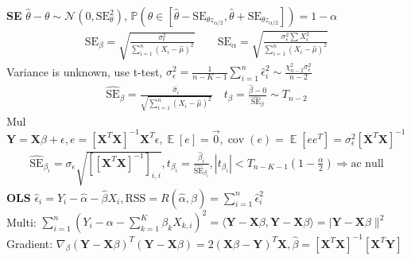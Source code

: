 \documentclass[10pt,landscape, a4paper]{article}
\theoremstyle{remark}
\newcommand{\E}{\operatorname{\mathbb{E}}}
\newcommand{\abs}[1]{\left\lvert #1 \right\rvert}
\newcommand{\cov}[1]{\operatorname{cov}(#1)}
\newcommand{\SE}{\mathrm{SE}}
\newcommand{\prob}{\mathbb{P}}
\begin{document}
\begin{multicols*}{3}
\textbf{SE} $\hat{\theta} - \theta \sim \mathcal{N} (0, \SE^2_{\theta})$, $\prob (\theta \in [\hat{\theta} - \SE_{\theta z_{\alpha /2}}, \hat{\theta} + \SE_{\theta z_{\alpha /2}}]) = 1-\alpha$
\begin{align*}
    \SE_\beta = \sqrt{\frac{\sigma^2_\epsilon}{\sum^n_{i=1} (X_i -\hat{\mu})^2}} \qquad 
    \SE_\alpha = \sqrt{\frac{\sigma^2_{\epsilon} \sum X_i^2}{\sum^n_{i=1} (X_i - \hat{\mu})^2}}
\end{align*}
Variance is unknown, use t-test, $\sigma^2_\epsilon = \frac{1}{n-K-1}\sum^n_{i=1} \hat{\epsilon}^2_i\sim \frac{\chi^2_{n-2} \sigma^2_{\epsilon}}{n-2} $
\begin{align*}
    \hat{\SE}_\beta = \frac{\hat{\sigma}_\epsilon}{\sqrt{\sum^n_{i=1} (X_i - \hat{\mu})^2}} \quad t_\beta = \frac{\hat{\beta} - 0}{\hat{\SE}_\beta} \sim T_{n-2}
\end{align*}
Mul $\mathbf{Y} = \mathbf{X}\beta + \epsilon, e = [\mathbf{X}^T \mathbf{X}]^{-1} \mathbf{X}^T \epsilon, \E [e] = \Vec{0}, \cov{e} = \E [ee^T] = \sigma^2_\epsilon [\mathbf{X}^T \mathbf{X}]^{-1}$ 
\begin{align*}
    \hat{\SE}_{\beta_i} = \sigma_\epsilon \sqrt{\left[[\mathbf{X}^T \mathbf{X}]^{-1} \right]_{i, i}}, t_{\beta_i} = \frac{\hat{\beta}_i}{\hat{\SE}_{\beta_i}}, \abs{t_{\beta_i}} < T_{n-K-1} (1 - \frac{\alpha}{2}) \Rightarrow \text{ac null}
\end{align*}
\textbf{OLS} $\hat{\epsilon}_i = Y_i - \hat{\alpha} - \hat{\beta}X_i, \mathrm{RSS} = R(\hat{\alpha}, \hat{\beta}) = \sum^n_{i=1} \hat{\epsilon}^2_i$\\
Multi: $\sum^n_{i=1} (Y_i - \alpha - \sum^K_{k=1} \beta_k X_{k, i})^2 = \langle \mathbf{Y-X}\beta, \mathbf{Y-X}\beta \rangle = \lvert \mathbf{Y-X}\beta \rVert^2$
Gradient: $\nabla_\beta (\mathbf{Y-X}\beta)^T (\mathbf{Y-X}\beta) = 2(\mathbf{X}\beta - \mathbf{Y})^T \mathbf{X}, \hat{\beta} = [\mathbf{X}^T \mathbf{X}]^{-1} [\mathbf{X}^T \mathbf{Y}]$

\end{multicols*}
\end{document}
